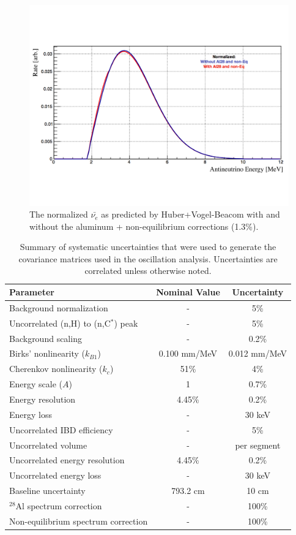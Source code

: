 \begin{figure}[H]
	\centering
	\includegraphics[width=0.7\linewidth]{tex/7-oscillation-images/SpectrumWithCorrections}
	\caption{The normalized $\bar{\nu_{e}}$ as predicted by Huber+Vogel-Beacom with and without the aluminum + non-equilibrium corrections (1.3\%).}
	\label{fig:spectrumwithcorrections}
\end{figure}

\begin{table}[H]
\centering
\begin{tabular}{lcc}
	\hline 
	\textbf{Parameter} & \textbf{Nominal Value} & \textbf{Uncertainty} \\ 
	\hline 
	Background normalization  & - & 5\% \\ 
	Uncorrelated (n,H) to (n,C$^*$) peak & - & 5\% \\ 
	Background scaling & - & 0.2\% \\ 
	\hline 
	Birks' nonlinearity ($k_{B1}$) & 0.100 mm/MeV & 0.012 mm/MeV \\ 
	Cherenkov nonlinearity ($k_c$) & 51\% & 4\% \\ 
	Energy scale ($A$) & 1 & 0.7\% \\ 
	Energy resolution & 4.45\% & 0.2\% \\ 
	Energy loss & - & 30 keV \\ 
	Uncorrelated IBD efficiency & - & 5\% \\ 
	Uncorrelated volume & - & per segment \\ 
	Uncorrelated energy resolution & 4.45\% & 0.2\% \\ 
	Uncorrelated energy loss  & - & 30 keV \\ 
	Baseline uncertainty & 793.2 cm & 10 cm \\ 
	\hline 
	$^{28}$Al spectrum correction & - & 100\% \\ 
	Non-equilibrium spectrum correction & - & 100\% \\ 
	\hline 
\end{tabular} 
\caption{Summary of systematic uncertainties that were used to generate the covariance matrices used in the oscillation analysis. Uncertainties are correlated unless otherwise noted.}
\label{tab:sysunc}
\end{table}

